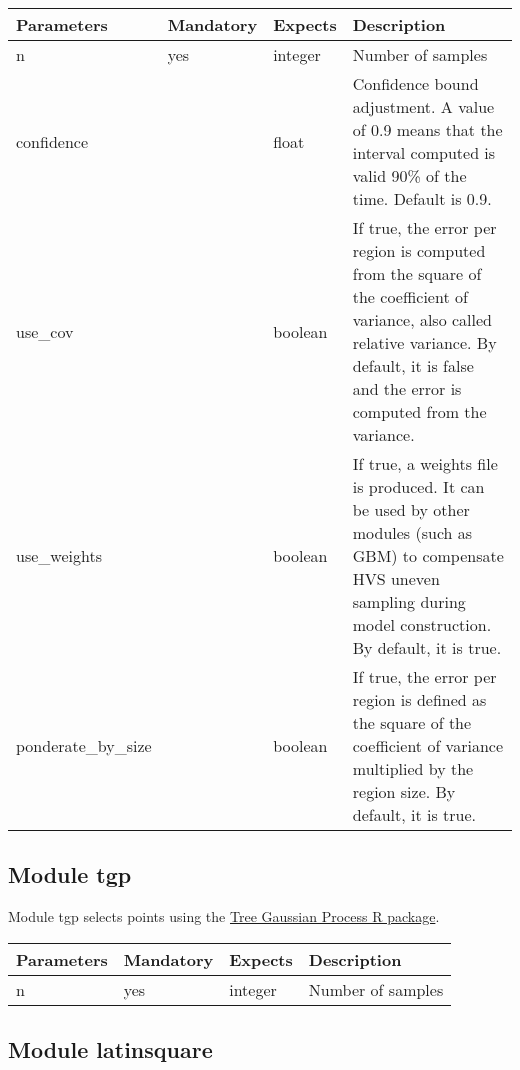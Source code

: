 	\vspace{0.5cm}\begin{tabular}{| p{} | p{} | p{} | p{}  |}
		\hline
		\textbf{ Parameters} & \textbf{ Mandatory} & \textbf{ Expects} & \textbf{ Description} \\ \hline
		 n &  yes &  integer &  Number of samples \\ \hline
		 confidence &   &  float &  Confidence bound adjustment. A value of 0.9 means that the interval computed is valid 90\% of the time. Default is 0.9. \\ \hline
		 use\_cov &   &  boolean &  If true, the error per region is computed from the square of the coefficient of variance, also called relative variance. By default, it is false and the error is computed from the variance. \\ \hline
     use\_weights & & boolean & If true, a weights file is produced. It can be used by other modules (such as GBM) to compensate HVS uneven sampling during model construction. By default, it is true. \\ \hline
		 ponderate\_by\_size &   &  boolean &  If true, the error per region is defined as the square of the coefficient of variance multiplied by the region size. By default, it is true. \\ \hline
	\end{tabular}

\subsection{Module tgp}

Module tgp selects points using the \href{http://cran.r-project.org/web/packages/tgp/}{Tree Gaussian Process R package}. 

	\vspace{0.5cm}\begin{tabular}{| p{} | p{} | p{} | p{}  |}
		\hline
		\textbf{ Parameters} & \textbf{ Mandatory} & \textbf{ Expects} & \textbf{ Description} \\ \hline
		 n &  yes &  integer &  Number of samples \\ \hline
	\end{tabular}

\subsection{Module latinsquare}

